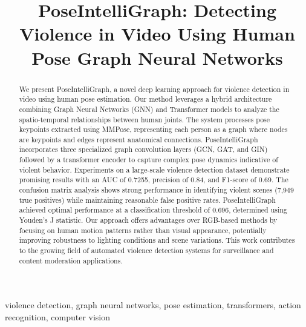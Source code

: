 \documentclass[conference]{IEEEtran}
\begin{document}
\title{PoseIntelliGraph: Detecting Violence in Video Using Human Pose Graph Neural Networks\\
}

\author{
}

\maketitle

\begin{abstract}
We present PoseIntelliGraph, a novel deep learning approach for violence detection in video using human pose estimation. Our method leverages a hybrid architecture combining Graph Neural Networks (GNN) and Transformer models to analyze the spatio-temporal relationships between human joints. The system processes pose keypoints extracted using MMPose, representing each person as a graph where nodes are keypoints and edges represent anatomical connections. PoseIntelliGraph incorporates three specialized graph convolution layers (GCN, GAT, and GIN) followed by a transformer encoder to capture complex pose dynamics indicative of violent behavior. Experiments on a large-scale violence detection dataset demonstrate promising results with an AUC of 0.7255, precision of 0.84, and F1-score of 0.69. The confusion matrix analysis shows strong performance in identifying violent scenes (7,949 true positives) while maintaining reasonable false positive rates. PoseIntelliGraph achieved optimal performance at a classification threshold of 0.696, determined using Youden's J statistic. Our approach offers advantages over RGB-based methods by focusing on human motion patterns rather than visual appearance, potentially improving robustness to lighting conditions and scene variations. This work contributes to the growing field of automated violence detection systems for surveillance and content moderation applications.
\end{abstract}

\begin{IEEEkeywords}
violence detection, graph neural networks, pose estimation, transformers, action recognition, computer vision
\end{IEEEkeywords}
\end{document}
